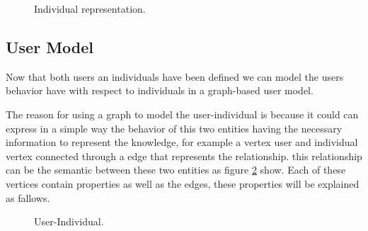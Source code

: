 \documentclass[conference]{IEEEtran}
\begin{document}
\begin{figure}
\captionsetup{justification=centering,margin=2cm}
\centering
\setlength\fboxsep{0pt}
\setlength\fboxrule{0.7pt}
\caption{Individual representation.}
\label{fig:graph}       
\end{figure}


\subsection{User Model} Now that both users an individuals have been defined we can
model the users behavior have with respect to individuals in a graph-based user
model.

The reason for using a graph to model the user-individual is because it could
can express in a simple way the behavior of this two entities having the
necessary information  to represent the knowledge,  for example a vertex user
and individual vertex connected through a edge that  represents the
relationship. this relationship can be the semantic  between these two entities
as figure \ref{fig:User-Individual} show. Each of these vertices contain properties as well as the
edges, these properties will be explained as fallows.

\begin{figure}
\captionsetup{justification=centering,margin=2cm}
\centering
\setlength\fboxsep{0pt}
\setlength\fboxrule{0.7pt}
\caption{User-Individual.}
\label{fig:User-Individual}       
\end{figure}
\end{document}
